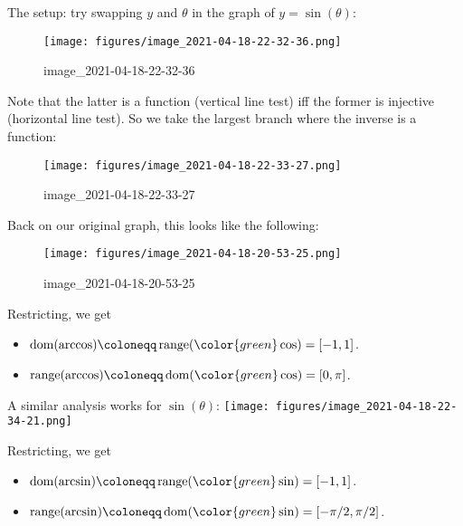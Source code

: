 \begin{remark}

The setup: try swapping \(y\) and \(\theta\) in the graph of
\(y=\sin(\theta)\):

\begin{figure}
\centering
\texttt{[image: figures/image\_2021-04-18-22-32-36.png]}
\caption{image\_2021-04-18-22-32-36}
\end{figure}

Note that the latter is a function (vertical line test) iff the former
is injective (horizontal line test). So we take the largest branch where
the inverse is a function:

\begin{figure}
\centering
\texttt{[image: figures/image\_2021-04-18-22-33-27.png]}
\caption{image\_2021-04-18-22-33-27}
\end{figure}

Back on our original graph, this looks like the following:

\begin{figure}
\centering
\texttt{[image: figures/image\_2021-04-18-20-53-25.png]}
\caption{image\_2021-04-18-20-53-25}
\end{figure}

Restricting, we get

\begin{itemize}
\tightlist
\item
  \(\operatorname{dom}(\arccos) \coloneqq\mathop{\mathrm{range}}({ \color{green} \cos} ) = [-1, 1]\).
\item
  \(\mathop{\mathrm{range}}(\arccos) \coloneqq\operatorname{dom}( {\color{green} \cos} ) = [0, \pi]\).
\end{itemize}

\end{remark}

\begin{remark}

A similar analysis works for \(\sin(\theta)\):
\texttt{[image: figures/image\_2021-04-18-22-34-21.png]}

Restricting, we get

\begin{itemize}
\tightlist
\item
  \(\operatorname{dom}(\arcsin) \coloneqq\mathop{\mathrm{range}}({ \color{green} \sin} ) = [-1, 1]\).
\item
  \(\mathop{\mathrm{range}}(\arcsin) \coloneqq\operatorname{dom}( {\color{green} \sin }) = [-\pi/2, \pi/2]\).
\end{itemize}

\end{remark}

